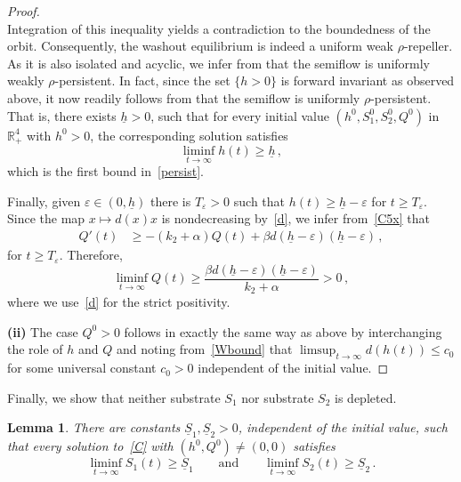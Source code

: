\documentclass[reqno,11pt]{amsart}
\newtheorem{lem}[thm]{Lemma}
\numberwithin{equation}{section}
\newcommand{\R}{\mathbb{R}}
\begin{document}
\begin{proof}
\begin{equation*}
\end{equation*}
Integration of this inequality yields a contradiction to the boundedness of the orbit.   Consequently, the washout equilibrium is indeed a uniform weak $\rho$-repeller.  
As it is also isolated and acyclic, we infer from \cite[Theorem~8.17]{SmithThieme2011} that the semiflow is uniformly weakly $\rho$-persistent.
In fact, since the set $\{h>0\}$ is forward invariant as observed above, it now readily follows from \cite[Theorem~4.5]{SmithThieme2011} that the semiflow is uniformly $\rho$-persistent.  That is, there exists $\underline{h}>0$, such that for every initial value $(h^0,S_1^0,S_2^0,Q^0)$ in $\R_+^4$ with  $h^0>0$, the corresponding solution  %
satisfies
\[
\liminf_{t\to\infty}  h(t)\ge\underline{h}\,,
\]
which is the first bound in~\eqref{persist}.

Finally, given $\varepsilon\in(0,\underline{h})$ there is $T_\varepsilon>0$ such that $h(t)\ge\underline{h}-\varepsilon$ for $t\ge T_\varepsilon$. Since the map $x\mapsto d(x)x$ is nondecreasing by~\eqref{d}, we infer from~\eqref{C5x} that 
\begin{align*}
Q'(t)&\ge -(k_2+\alpha)Q(t)+\beta d(\underline{h}-\varepsilon)(\underline{h}-\varepsilon)\,,
\end{align*}
for $t\ge T_\varepsilon$. Therefore,
\begin{equation*}
\liminf_{t\to\infty} Q(t)\ge\frac{\beta d(\underline{h}-\varepsilon)(\underline{h}-\varepsilon)}{k_2+\alpha}>0\,,
\end{equation*}
where we use~\eqref{d} for the strict positivity.

{\bf(ii)} The case $Q^0>0$ follows in exactly the same way as above by interchanging the role of $h$ and $Q$ and noting from~\eqref{Wbound} that $\limsup_{t\to\infty}d(h(t))\le c_0$ for some universal constant $c_0>0$ independent of the initial value.
\end{proof}


Finally, we show that neither substrate $S_1$ nor substrate $S_2$ is depleted.

\begin{lem}%
There are constants $\underline{S}_1,\underline{S}_2>0$,
independent of the initial value, such that every solution to~\eqref{C} with $(h^0,Q^0)\neq(0,0)$ satisfies
\begin{equation}\label{persistS}
\liminf_{t\to\infty}S_1(t)\ge\underline{S}_1\qquad\text{and}\qquad\liminf_{t\to\infty}S_2(t)\ge\underline{S}_2\,.
\end{equation}
\end{lem}
\end{document}
